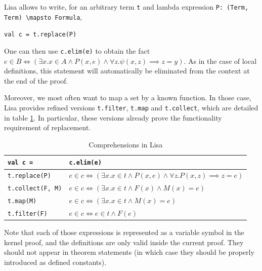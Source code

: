       Lisa allows to write, for an arbitrary term \lstinline|t| and lambda expression \lstinline|P: (Term, Term) \mapsto Formula|,
      \begin{center}
        \lstinline|val c = t.replace(P)|
      \end{center}
      One can then use \lstinline|c.elim(e)| to obtain the fact
      $e \in B \iff (\exists x. x \in A \land P(x, e) \land \forall z. \psi(x, z) \implies z = y)$. As in the case of local definitions, this statement will automatically be eliminated from the context at the end of the proof.

      Moreover, we most often want to map a set by a known function. In those case, Lisa provides refined versions \lstinline|t.filter|, \lstinline|t.map| and \lstinline|t.collect|, which are detailed in table \ref{tab:comprehensions}. In particular, these versions already prove the functionality requirement of replacement.
      \begin{table}[h]
        \begin{tabular}{l|l}
          \textbf{\lstinline|val c = |} & \textbf{\lstinline|c.elim(e)|} \\ \hline
          \lstinline|t.replace(P)| & $e \in c \iff (\exists x. x \in t \land P(x, e) \land ∀ z. P(x, z) \implies z = e)$ \\
          \lstinline|t.collect(F, M)| & $e \in c \iff (\exists x. x \in t \land F(x) \land M(x) = e)$ \\
          \lstinline|t.map(M)| & $e \in c \iff (\exists x. x \in t \land M(x) = e)$ \\
          \lstinline|t.filter(F)| & $e \in c \iff e \in t \land F(e)$ \\
        \end{tabular}
        \caption{Comprehensions in Lisa}
        \label{tab:comprehensions}
      \end{table}

      Note that each of those expressions is represented as a variable symbol in the kernel proof, and the definitions are only valid inside the current proof. They should not appear in theorem statements (in which case they should be properly introduced as defined constants).